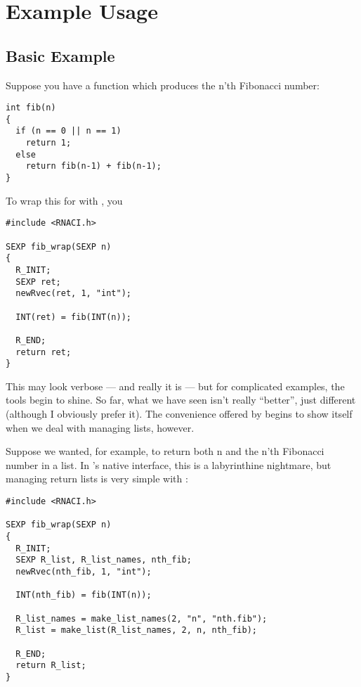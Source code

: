 \section{Example Usage}\label{example}


\subsection{Basic Example}

Suppose you have a \C function  which produces the n'th 
Fibonacci number:
\begin{lstlisting}[language=fanC,title=Fibonacci]
int fib(n)
{
  if (n == 0 || n == 1)
    return 1;
  else
    return fib(n-1) + fib(n-1);
}
\end{lstlisting}

To wrap this for \R with \thispackage, you 
\begin{lstlisting}[language=fanC,title=Fibonacci Wrapper]
#include <RNACI.h>

SEXP fib_wrap(SEXP n)
{
  R_INIT;
  SEXP ret;
  newRvec(ret, 1, "int");
  
  INT(ret) = fib(INT(n));
  
  R_END;
  return ret;
}
\end{lstlisting}

This may look verbose --- and really it is --- but for complicated examples, 
the tools begin to shine.  So far, what we have seen isn't really ``better'', 
just different (although I obviously prefer it).  The convenience offered by 
\thispackage begins to show itself when we deal with managing lists, however.

Suppose we wanted, for example, to return both n and 
the n'th Fibonacci number in a list.  In \R's native \C interface, this is a 
labyrinthine nightmare, but managing return lists is very simple with 
\thispackage:

\begin{lstlisting}[language=fanC,title=Fibonacci Wrapper 2]
#include <RNACI.h>

SEXP fib_wrap(SEXP n)
{
  R_INIT;
  SEXP R_list, R_list_names, nth_fib;
  newRvec(nth_fib, 1, "int");
  
  INT(nth_fib) = fib(INT(n));
  
  R_list_names = make_list_names(2, "n", "nth.fib");
  R_list = make_list(R_list_names, 2, n, nth_fib);
  
  R_END;
  return R_list;
}
\end{lstlisting}

